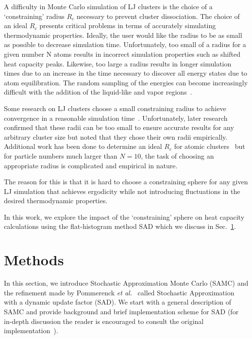 \documentclass[letterpaper,twocolumn,amsmath,amssymb,pre,aps,10pt]{revtex4-1}
\begin{document}

A difficulty in Monte Carlo simulation of LJ clusters is the choice of a `constraining' radius $R_c$ necessary to prevent cluster dissociation.
The choice of an ideal $R_c$ presents critical problems in terms of accurately simulating thermodynamic
properties. Ideally, the user would like the radius to be as small as possible to decrease simulation time.
Unfortunately, too small of a radius for a given number N atoms results in incorrect simulation properties
such as shifted heat capacity peaks. Likewise, too large a radius results in longer simulation times
due to an increase in the time necessary to discover all energy states due to atom equilibration. The random
sampling of the energies can become increasingly difficult with the addition of the liquid-like and vapor regions~\cite{neirotti2000phase}.

Some research on LJ clusters choose a small constraining radius to achieve convergence in
a reasonable simulation time~\cite{neirotti2000phase}. Unfortunately, later research~\cite{frantz2001magic} confirmed that these radii can be too small
to ensure accurate results for any arbitrary cluster size but noted that they chose their own radii empirically. Additional work has been done to determine
an ideal $R_c$ for atomic clusters~\cite{yin2012massively} but for particle numbers much larger than $N=10$, the task of choosing an appropriate radius is complicated and empirical
in nature. 

The reason for this is that it is hard to choose a constraining sphere for any given LJ simulation that achieves ergodicity while not introducing fluctuations in the desired thermodynamic properties.

In this work, we explore the impact of the `constraining' sphere on heat capacity calculations using the flat-histogram
method SAD which we discuss in Sec.~\ref{sec:methods}.

\section{Methods}\label{sec:methods}
In this section, we introduce Stochastic Approximation Monte Carlo (SAMC) and
the refinement made by Pommerenck \emph{et al.}~\cite{pommerenck2020stochastic}
called Stochastic Approximation with a dynamic update factor (SAD). We start with a general description of SAMC and provide background and brief implementation scheme for SAD (for in-depth discussion the reader is encouraged to consult the original implementation~\cite{pommerenck2020stochastic}).
\end{document}
